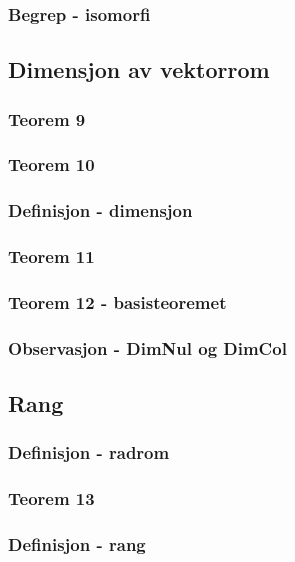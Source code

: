 \documentclass{article}
\begin{document}
      \subsubsection{Begrep - isomorfi}
        
    \subsection{Dimensjon av vektorrom}
      \subsubsection{Teorem 9}
        
      \subsubsection{Teorem 10}
        
      \subsubsection{Definisjon - dimensjon}
        
      \subsubsection{Teorem 11}
        
      \subsubsection{Teorem 12 - basisteoremet}
        
      \subsubsection{Observasjon - DimNul og DimCol}
        
    \subsection{Rang}
      \subsubsection{Definisjon - radrom}
        
      \subsubsection{Teorem 13}
        
      \subsubsection{Definisjon - rang}
        
\end{document}
